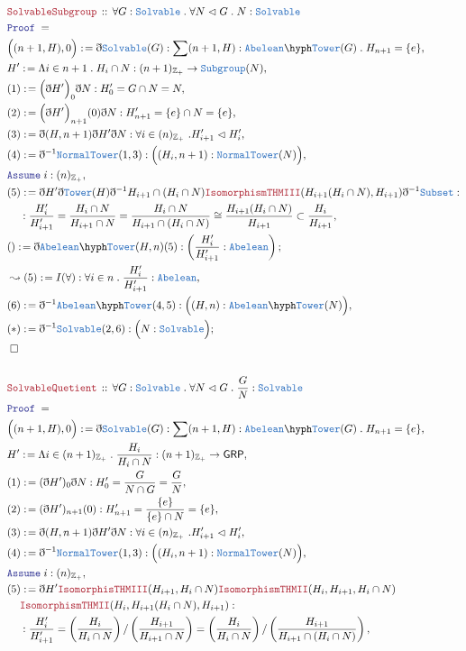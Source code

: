 \documentclass[12pt]{scrartcl}
\newcommand{\TYPE}[1]{\textcolor{NavyBlue}{\mathtt{#1}}}
\newcommand{\LOGIC}[1]{\textcolor{Blue}{\mathtt{#1}}}
\newcommand{\THM}[1]{\textcolor{Maroon}{\mathtt{#1}}}
\renewcommand{\.}{\; . \;}
\newcommand{\de}{: \kern 0.1pc =}
\newcommand{\Theorem}[2]{& \THM{#1} \, :: \, #2 \\ & \Proof = \\ }
\newcommand{\NewLine}{\\ & \kern 1pc}
\newcommand{\Page}[1]{ \begin{align*} #1 \end{align*}   }
\newcommand{ \bd }{ \ByDef }
\newcommand{\Int}{\mathbb{Z} }
\newcommand{\Say}[3]{& #1 \de #2 : #3, \\}
\newcommand{\Conclude}[3]{& #1 \de #2 : #3; \\}
\newcommand{\Derive}[3]{& \leadsto #1 \de #2 : #3, \\}
\newcommand{\Assume}[2]{& \LOGIC{Assume} \; #1 : #2, \\}
\newcommand{\QED}{\; \square}
\newcommand{\EndProof}{& \QED \\}
\newcommand{\ByDef}{\eth}
\newcommand{\Proof}{\LOGIC{Proof} \; }
\newcommand{\Abel}{\TYPE{Abelean}}
\newcommand{\Nrml}{\vartriangleleft}
\newcommand{\GRP}{\mathsf{GRP}}
\begin{document}
\Page{
	\Theorem{SolvableSubgroup}{\forall G : \TYPE{Solvable} \. \forall N \Nrml G \. N : \TYPE{Solvable}}
	\Say{\Big((n+1,H),0\Big)}{ \bd \TYPE{Solvable}(G) }{ \sum (n+1,H) : \Abel\hyph\TYPE{Tower}(G) 
		\.  H_{n + 1} = \{ e \} 
	}
	\Say{H'}{\Lambda i \in n + 1 \. H_i \cap N}{(n + 1)_{\Int_+} \to  \TYPE{Subgroup}(N) }
	\Say{(1)}{\Big( \bd H'    \Big)_0\bd N}{ H'_0  = G \cap N = N   }
	\Say{(2)}{\Big( \bd H' \Big)_{n+1}(0)\bd N}{ H'_{n+1} = \{  e   \} \cap N = \{e\}  }
	\Say{(3)}{ \bd (H,n+1) \bd H' \bd N    }{ \forall i \in (n)_{\Int_+} \ . H_{i+1}' \Nrml H_i'}
	\Say{(4)}{ \bd^{-1}\TYPE{NormalTower}(1,3) }{ \Big( (H_i,n+1) : \TYPE{NormalTower}( N )   \Big)  }
	\Assume{i}{(n)_{\Int_+}}
	\Say{(5)}{ 
		\bd H' \bd \TYPE{Tower}(H)\bd^{-1} H_{i+1} \cap (H_i \cap N) 
		\THM{IsomorphismTHMIII}( H_{i+1}(H_i \cap N),H_{i+1} )
		\bd^{-1} \TYPE{Subset}
	}
	{
		\NewLine :
		\frac{H'_i}{H'_{i+1}} = \frac{H_i \cap N}{H_{i+1} \cap N} = 
		\frac{H_i \cap N}{ H_{i+1} \cap (H_{i} \cap N)} \cong
		\frac{H_{i+1}(H_i \cap N)}{H_{i+1}} \subset 
		\frac{H_{i}}{H_{i+1}}             
	}
	\Conclude{()}{\bd \Abel \hyph \TYPE{Tower}(H,n)(5)}{\left(  \frac{H'_i}{H'_{i+1}} : \Abel \right)}
	\Derive{(5)}{I(\forall)}{\forall i \in n \. \frac{H'_i}{H'_{i+1}} : \Abel}
	\Say{(6)}{\bd^{-1} \Abel \hyph \TYPE{Tower}(4,5)}{\Big( (H,n) : \Abel \hyph \TYPE{Tower}(N) \Big)}
	\Conclude{(*)}{\bd^{-1} \TYPE{Solvable}(2,6)}{\Big( N :  \TYPE{Solvable}\Big)}
	\EndProof
	\\
	\Theorem{SolvableQuetient}{ \forall G : \TYPE{Solvable} \. \forall N \Nrml G \. \frac{G}{N} : \TYPE{Solvable} }
	\Say{\Big((n+1,H),0\Big)}{ \bd \TYPE{Solvable}(G) }{ \sum (n+1,H) : \Abel\hyph\TYPE{Tower}(G) 
		\.  H_{n + 1} = \{ e \} }	
	\Say{H'}{  \Lambda i \in (n+1)_{\Int_+} \. \frac{H_i}{H_i \cap N}    }{(n+1)_{\Int_+} \to  \GRP   }
	\Say{(1)}{  (\bd H')_0  \bd N        }{  H'_0  = \frac{G}{N \cap G} = \frac{G}{N} }
	\Say{(2)}{ (\bd H')_{n+1} (0)  }{  H'_{n+1} = \frac{\{e\}}{\{e\} \cap N } = \{e\}   }
	\Say{(3)}{ \bd (H,n+1) \bd H' \bd N    }{ \forall i \in (n)_{\Int_+} \ . H_{i+1}' \Nrml H_i'}
	\Say{(4)}{ \bd^{-1}\TYPE{NormalTower}(1,3) }{ \Big( (H_i,n+1) : \TYPE{NormalTower}( N )   \Big)  }
	\Assume{i}{(n)_{\Int_+}}
	\Say{(5)}{\bd H'  \THM{IsomorphisTHMIII}(H_{i+1},H_i \cap N)      
		\THM{IsomorphismTHMII}(H_i,H_{i+1},H_i \cap N)
		\NewLine
		\THM{IsomorphismTHMII}(H_{i}, H_{i+1}(H_i \cap N)  , H_{i+1})
	}
	{  
	   \NewLine :
	   \frac{H_{i}'}{H_{i+1}'} = \left( \frac{H_i}{H_i \cap N} \right)/\left( \frac{H_{i+1}}{H_{i+1} \cap N} \right)   
	   = \left( \frac{H_i}{H_i \cap N} \right)/\left( \frac{H_{i+1}}{H_{i+1} \cap ( H_i  \cap N)} \right) 
}}
\end{document}
